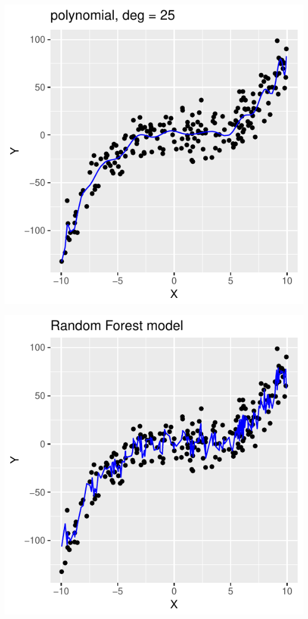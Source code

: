 \begin{frame}
\begin{analysis}
\begin{minipage}[c]{0.24\linewidth}
\end{minipage} 
\begin{minipage}[c]{0.24\linewidth}
\includegraphics[width=1.0\linewidth]{../LectureAssets/L04/SimpleRegCV25}
\end{minipage} 
\begin{minipage}[c]{0.24\linewidth}
\includegraphics[width=1.0\linewidth]{../LectureAssets/L04/SimpleRegCVRF}
\end{minipage} 



\end{analysis}
\end{frame}
